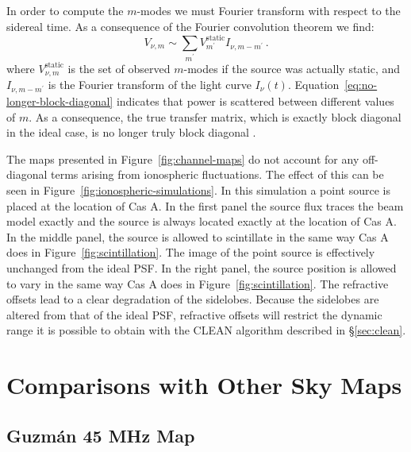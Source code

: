 \documentclass[twocolumn]{aastex61}
\begin{document}
In order to compute the $m$-modes we must Fourier transform with respect to the sidereal time. As a
consequence of the Fourier convolution theorem we find:
\begin{equation}\label{eq:no-longer-block-diagonal}
    V_{\nu, m} \sim \sum_{m^\prime} V_{m^\prime}^\textrm{static} I_{\nu, m-m^\prime}\,.
\end{equation}
where $V_{\nu, m}^{\textrm{static}}$ is the set of observed $m$-modes if the source was actually
static, and $I_{\nu, m-m^\prime}$ is the Fourier transform of the light curve $I_{\nu}(t)$.
Equation~\ref{eq:no-longer-block-diagonal} indicates that power is scattered between different
values of $m$. As a consequence, the true transfer matrix, which is exactly block diagonal in the
ideal case, is no longer truly block diagonal \citep{richard_ionosphere_thoughts}.

The maps presented in Figure~\ref{fig:channel-maps} do not account for any off-diagonal terms
arising from ionospheric fluctuations. The effect of this can be seen in
Figure~\ref{fig:ionospheric-simulations}. In this simulation a point source is placed at the
location of Cas A. In the first panel the source flux traces the beam model exactly and the source
is always located exactly at the location of Cas A. In the middle panel, the source is allowed to
scintillate in the same way Cas A does in Figure~\ref{fig:scintillation}. The image of the point
source is effectively unchanged from the ideal PSF. In the right panel, the source position is
allowed to vary in the same way Cas A does in Figure~\ref{fig:scintillation}. The refractive offsets
lead to a clear degradation of the sidelobes. Because the sidelobes are altered from that of the
ideal PSF, refractive offsets will restrict the dynamic range it is possible to obtain with the
CLEAN algorithm described in \S\ref{sec:clean}.

\section{Comparisons with Other Sky Maps}\label{sec:compare}

\subsection{Guzm\'{a}n 45 MHz Map}
\end{document}
